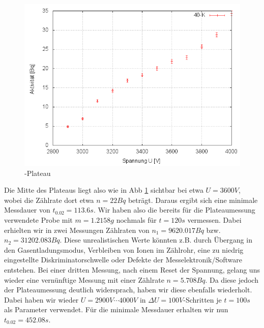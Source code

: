 \begin{figure}[H]
 \centering \includegraphics[width = 0.99\linewidth]{Messwerte/plots/K40_plateau.png}
 \caption{-Plateau}
 \label{k40plateau}
\end{figure}

Die Mitte des Plateaus liegt also wie in Abb \ref{k40plateau} sichtbar bei etwa $U = 3600V$, wobei die Zählrate dort etwa $n = 22 Bq$ beträgt. Daraus ergibt sich eine minimale Messdauer von $t_{0.02} = 113.6 s$. Wir haben also die bereits für die Plateaumessung verwendete Probe mit $m = 1.2158g$ nochmals für $t = 120s$ vermessen. Dabei erhielten wir in zwei Messungen Zählraten von $n_1 = 9620.017 Bq$ bzw. $n_2 = 31 202.083 Bq$. Diese unrealistischen Werte könnten z.B. durch Übergang in den Gasentladungsmodus, Verbleiben von Ionen im Zählrohr, eine zu niedrig eingestellte Diskriminatorschwelle oder Defekte der Messelektronik/Software entstehen. Bei einer dritten Messung, nach einem Reset der Spannung, gelang uns wieder eine vernünftige Messung mit einer Zählrate $n = 5.708 Bq$. Da diese jedoch der Plateaumessung deutlich widersprach, haben wir diese ebenfalls wiederholt. Dabei haben wir wieder $U = 2900V \cdots 4000V$ in $\Delta U = 100 V$-Schritten je $t=100s$ als Parameter verwendet. 
Für die minimale Messdauer erhalten wir nun $t_{0.02} = 452.08 s$.

